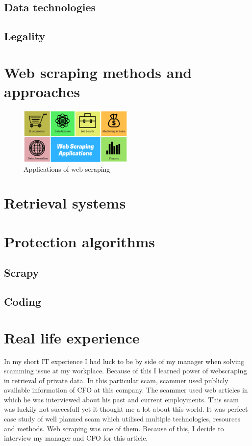 \documentclass[10pt,twoside]{article}
\begin{document}
\subsection{Data technologies}

\subsection{Legality}

\section{Web scraping methods and approaches}\label{methods-approaches}

\begin{figure}[htp]
  \centering
  \includegraphics[width=0.5\textwidth]{photo1}
  \caption{Applications of web scraping\cite{towardsdatascience-web-scraping}}
 
\end{figure}

\section{Retrieval systems}\label{even-more-important-section}

\section{Protection algorithms}\label{protection-algorithms}
\subsection{Scrapy}
\subsection{Coding}

\section{Real life experience}\label{real-life-experience}
In my short IT experience I had luck to be by side of my manager when solving scamming issue at my workplace. Because of this I learned power of webscraping in retrieval of private data. In this particular scam, scammer used publicly available information of CFO at this company. The scammer used web articles in which he was interviewed about his past and current employments. This scam was luckily not succesfull yet it thought me a lot about this world. It was perfect case study of well planned scam which utilised multiple technologies, resources and methods. Web scraping was one of them. Because of this, I decide to interview my manager and CFO for this article.
\end{document}
